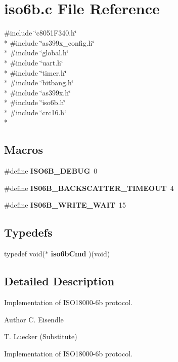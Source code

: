 \section{iso6b.\-c File Reference}
\label{iso6b_8c}
{\ttfamily \#include \char`\"{}c8051\-F340.\-h\char`\"{}}\\*
{\ttfamily \#include \char`\"{}as399x\-\_\-config.\-h\char`\"{}}\\*
{\ttfamily \#include \char`\"{}global.\-h\char`\"{}}\\*
{\ttfamily \#include \char`\"{}uart.\-h\char`\"{}}\\*
{\ttfamily \#include \char`\"{}timer.\-h\char`\"{}}\\*
{\ttfamily \#include \char`\"{}bitbang.\-h\char`\"{}}\\*
{\ttfamily \#include \char`\"{}as399x.\-h\char`\"{}}\\*
{\ttfamily \#include \char`\"{}iso6b.\-h\char`\"{}}\\*
{\ttfamily \#include \char`\"{}crc16.\-h\char`\"{}}\\*
\subsection*{Macros}
\begin{DoxyCompactItemize}
\item 
\#define {\bf I\-S\-O6\-B\-\_\-\-D\-E\-B\-U\-G}~0
\item 
\#define {\bf I\-S06\-B\-\_\-\-B\-A\-C\-K\-S\-C\-A\-T\-T\-E\-R\-\_\-\-T\-I\-M\-E\-O\-U\-T}~4
\item 
\#define {\bf I\-S06\-B\-\_\-\-W\-R\-I\-T\-E\-\_\-\-W\-A\-I\-T}~15
\end{DoxyCompactItemize}
\subsection*{Typedefs}
\begin{DoxyCompactItemize}
\item 
typedef void($\ast$ {\bf iso6b\-Cmd} )(void)
\end{DoxyCompactItemize}


\subsection{Detailed Description}
Implementation of I\-S\-O18000-\/6b protocol. \begin{DoxyAuthor}{Author}
C. Eisendle 

T. Luecker (Substitute)
\end{DoxyAuthor}
Implementation of I\-S\-O18000-\/6b protocol. 

